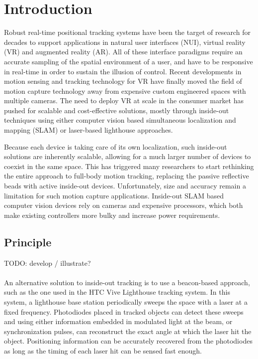 \documentclass[sigchi]{acmart}
\begin{document}
\section{Introduction}
Robust real-time positional tracking systems have been the target of research for decades to support applications in natural user interfaces (NUI), virtual reality (VR) and augmented reality (AR). All of these interface paradigms require an accurate sampling of the spatial environment of a user, and have to be responsive in real-time in order to sustain the illusion of control. Recent developments in motion sensing and tracking technology for VR have finally moved the field of motion capture technology away from expensive custom engineered spaces with multiple cameras. The need to deploy VR at scale in the consumer market has pushed for scalable and cost-effective solutions, mostly through inside-out techniques using either computer vision based simultaneous localization and mapping (SLAM) or laser-based lighthouse approaches.

Because each device is taking care of its own localization, such inside-out solutions are inherently scalable, allowing for a much larger number of devices to coexist in the same space. This has triggered many researchers to start rethinking the entire approach to full-body motion tracking, replacing the passive reflective beads with active inside-out devices. Unfortunately, size and accuracy remain a limitation for such motion capture applications. Inside-out SLAM based computer vision devices rely on cameras and expensive processors, which both make existing controllers more bulky and increase power requirements.

\subsection{Principle}
TODO: develop / illustrate?\\\\
An alternative solution to inside-out tracking is to use a beacon-based approach, such as the one used in the HTC Vive Lighthouse tracking system. In this system, a lighthouse base station periodically sweeps the space with a laser at a fixed frequency. Photodiodes placed in tracked objects can detect these sweeps and using either information embedded in modulated light at the beam, or synchronization pulses, can reconstruct the exact angle at which the laser hit the object. Positioning information can be accurately recovered from the photodiodes as long as the timing of each laser hit can be sensed fast enough.
\end{document}
